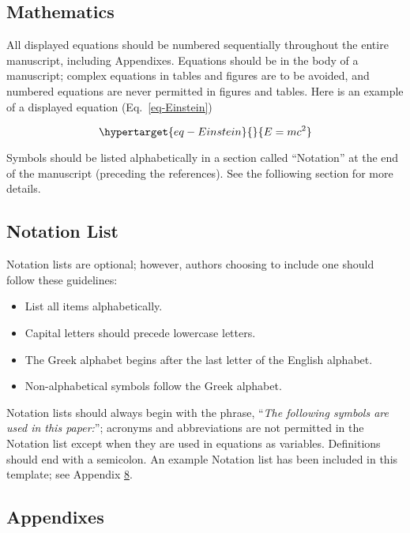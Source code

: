 \documentclass[
  NewProceedings,
  letterpaper]{./assets/ascelike-new}
\begin{document}
\hypertarget{mathematics}{%
\subsection{Mathematics}\label{mathematics}}

All displayed equations should be numbered sequentially throughout the
entire manuscript, including Appendixes. Equations should be in the body
of a manuscript; complex equations in tables and figures are to be
avoided, and numbered equations are never permitted in figures and
tables. Here is an example of a displayed equation
(Eq.~\ref{eq-Einstein})

\begin{equation}\protect\hypertarget{eq-Einstein}{}{
E = m c^{2}
}\label{eq-Einstein}\end{equation}

Symbols should be listed alphabetically in a section called ``Notation''
at the end of the manuscript (preceding the references). See the
folliowing section for more details.

\hypertarget{notation-list}{%
\subsection{Notation List}\label{notation-list}}

Notation lists are optional; however, authors choosing to include one
should follow these guidelines:

\begin{itemize}
\item
  List all items alphabetically.
\item
  Capital letters should precede lowercase letters.
\item
  The Greek alphabet begins after the last letter of the English
  alphabet.
\item
  Non-alphabetical symbols follow the Greek alphabet.
\end{itemize}

Notation lists should always begin with the phrase, ``\emph{The
following symbols are used in this paper:}''; acronyms and abbreviations
are not permitted in the Notation list except when they are used in
equations as variables. Definitions should end with a semicolon. An
example Notation list has been included in this template; see Appendix
\protect\hyperlink{app:notation}{8}.

\hypertarget{appendixes}{%
\subsection{Appendixes}\label{appendixes}}
\end{document}
